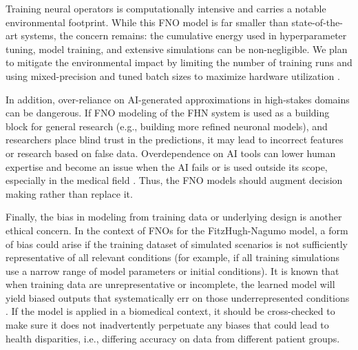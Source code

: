 \documentclass[runningheads]{llncs}
\begin{document}
Training neural operators is computationally intensive and carries a notable environmental footprint. While this FNO model is far smaller than state-of-the-art systems, the concern remains: the cumulative energy used in hyperparameter tuning, model training, and extensive simulations can be non-negligible. We plan to mitigate the environmental impact by limiting the number of training runs and using mixed-precision and tuned batch sizes to maximize hardware utilization \cite{patterson2022carbonfootprintmachinelearning}.

In addition, over-reliance on AI-generated approximations in high-stakes domains can be dangerous. If FNO modeling of the FHN system is used as a building block for general research (e.g., building more refined neuronal models), and researchers place blind trust in the predictions, it may lead to incorrect features or research based on false data. Overdependence on AI tools can lower human expertise and become an issue when the AI fails or is used outside its scope, especially in the medical field \cite{korkmaz2024artificial}. Thus, the FNO models should augment decision making rather than replace it.

Finally, the bias in modeling from training data or underlying design is another ethical concern. In the context of FNOs for the FitzHugh-Nagumo model, a form of bias could arise if the training dataset of simulated scenarios is not sufficiently representative of all relevant conditions (for example, if all training simulations use a narrow range of model parameters or initial conditions). It is known that when training data are unrepresentative or incomplete, the learned model will yield biased outputs that systematically err on those underrepresented conditions \cite{ferrara2023fairness}. If the model is applied in a biomedical context, it should be cross-checked to make sure it does not inadvertently perpetuate any biases that could lead to health disparities, i.e., differing accuracy on data from different patient groups.

\pagebreak



\end{document}
